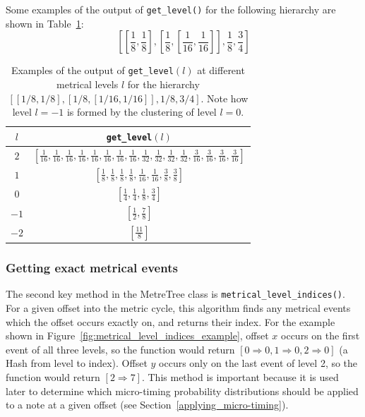 \documentclass[12pt,twoside,openright]{report}
\begin{document}
Some examples of the output of \verb'get_level()' for the following hierarchy are shown in Table~\ref{table:get_level}:
\[
    \left[
        \left[\frac{1}{8},\frac{1}{8}\right],
        \left[
            \frac{1}{8},
            \left[\frac{1}{16},\frac{1}{16}\right]
        \right],
        \frac{1}{8},
        \frac{3}{4}
    \right]
\]

\begin{table}[ht]
    \centering
    \renewcommand{\arraystretch}{2.0}
    \begin{tabular}{|c|c|}
        \hline
        $l$     & \verb'get_level'$(l)$ \\
        \hline
        $2$     & $\displaystyle \left[ \frac{1}{16},\frac{1}{16},\frac{1}{16},\frac{1}{16},\frac{1}{16},\frac{1}{16},\frac{1}{16},\frac{1}{16},\frac{1}{32},\frac{1}{32},\frac{1}{32},\frac{1}{32},\frac{3}{16},\frac{3}{16},\frac{3}{16},\frac{3}{16} \right]$ \\
        $1$     & $\displaystyle \left[ \frac{1}{8},\frac{1}{8},\frac{1}{8},\frac{1}{8},\frac{1}{16},\frac{1}{16},\frac{3}{8},\frac{3}{8} \right]$ \\
        $0$     & $\displaystyle \left[ \frac{1}{4},\frac{1}{4},\frac{1}{8},\frac{3}{4} \right]$ \\
        $-1$    & $\displaystyle \left[ \frac{1}{2},\frac{7}{8} \right]$ \\
        $-2$    & $\displaystyle \left[ \frac{11}{8} \right]$ \\ [1ex]
        \hline
    \end{tabular}
    \renewcommand{\arraystretch}{1.0}
    \cprotect\caption{Examples of the output of \verb'get_level'$(l)$ at different metrical levels $l$ for the hierarchy $[[1/8,1/8],[1/8,[1/16,1/16]],1/8,3/4]$. Note how level $l=-1$ is formed by the clustering of level $l=0$.}
    \label{table:get_level}
\end{table}

\subsubsection{Getting exact metrical events} \label{metrical_level_indices}

The second key method in the MetreTree class is \verb'metrical_level_indices()'. For a
given offset into the metric cycle, this algorithm finds any metrical events
which the offset occurs exactly on, and returns their index. For the example shown in Figure~\ref{fig:metrical_level_indices_example}, offset $x$
occurs on the first event of all three levels, so the function would return $[0 \Rightarrow 0,1 \Rightarrow 0,2 \Rightarrow 0]$ (a Hash from level to index). Offset $y$ occurs only on the last event of
level 2, so the function would return $[2 \Rightarrow 7]$. This method is important because it
is used later to determine which micro-timing probability distributions should
be applied to a note at a given offset (see Section~\ref{applying_micro-timing}).
\end{document}
